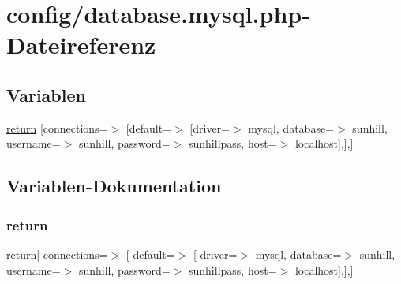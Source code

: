\hypertarget{database_8mysql_8php}{}\section{config/database.mysql.\+php-\/\+Dateireferenz}
\label{database_8mysql_8php}
\subsection*{Variablen}
\begin{DoxyCompactItemize}
\item 
\hyperlink{database_8mysql_8php_a1e5342c249ca3ddb1a87ba062127b7c9}{return} \mbox{[}\textquotesingle{}connections\textquotesingle{}=$>$ \mbox{[}\textquotesingle{}default\textquotesingle{}=$>$ \mbox{[}\textquotesingle{}driver\textquotesingle{}=$>$ \textquotesingle{}mysql\textquotesingle{}, \textquotesingle{}database\textquotesingle{}=$>$ \textquotesingle{}sunhill\textquotesingle{}, \textquotesingle{}username\textquotesingle{}=$>$ \textquotesingle{}sunhill\textquotesingle{}, \textquotesingle{}password\textquotesingle{}=$>$ \textquotesingle{}sunhillpass\textquotesingle{}, \textquotesingle{}host\textquotesingle{}=$>$ \textquotesingle{}localhost\textquotesingle{}\mbox{]},\mbox{]},\mbox{]}
\end{DoxyCompactItemize}


\subsection{Variablen-\/\+Dokumentation}
\mbox{\label{database_8mysql_8php_a1e5342c249ca3ddb1a87ba062127b7c9}} 
\subsubsection{\texorpdfstring{return}{return}}
{\footnotesize\ttfamily return\mbox{[} \textquotesingle{}connections\textquotesingle{}=$>$ \mbox{[} \textquotesingle{}default\textquotesingle{}=$>$ \mbox{[} \textquotesingle{}driver\textquotesingle{}=$>$ \textquotesingle{}mysql\textquotesingle{}, \textquotesingle{}database\textquotesingle{}=$>$ \textquotesingle{}sunhill\textquotesingle{}, \textquotesingle{}username\textquotesingle{}=$>$ \textquotesingle{}sunhill\textquotesingle{}, \textquotesingle{}password\textquotesingle{}=$>$ \textquotesingle{}sunhillpass\textquotesingle{}, \textquotesingle{}host\textquotesingle{}=$>$ \textquotesingle{}localhost\textquotesingle{}\mbox{]},\mbox{]},\mbox{]}}

